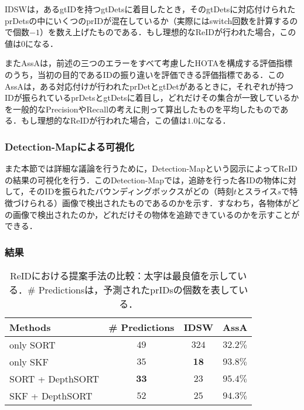     IDSW\cite{luiten2021hota}は，あるgtIDを持つgtDetsに着目したとき，そのgtDetsに対応付けられたprDetsの中にいくつのprIDが混在しているか（実際にはswitch回数を計算するので個数$-1$）を数え上げたものである．もし理想的なReIDが行われた場合，この値は$0$になる．

    またAssA\cite{luiten2021hota}は，前述の三つのエラーをすべて考慮したHOTAを構成する評価指標のうち，当初の目的であるIDの振り違いを評価できる評価指標である．このAssAは，ある対応付けが行われたprDetとgtDetがあるときに，それぞれが持つIDが振られているprDetsとgtDetsに着目し，どれだけその集合が一致しているかを一般的なPrecisionやRecallの考えに則って算出したものを平均したものである．もし理想的なReIDが行われた場合，この値は$1.0$になる．

    \subsubsection{Detection-Mapによる可視化}

    また本節では詳細な議論を行うために，Detection-Mapという図示によってReIDの結果の可視化を行う．このDetection-Mapでは，追跡を行った各IDの物体に対して，そのIDを振られたバウンディングボックスがどの（時刻$t$とスライス$s$で特徴づけられる）画像で検出されたものであるのかを示す．すなわち，各物体がどの画像で検出されたのか，どれだけその物体を追跡できているのかを示すことができる．
    
    \subsubsection{結果}

    \begin{table}[t]
        \centering
        \caption[ReIDにおける提案手法の比較]{ReIDにおける提案手法の比較：太字は最良値を示している．\# Predictionsは，予測されたprIDsの個数を表している．}
        \label{tab:metrics_reidentification}
        \begin{tabular}{l|ccc}
            Methods & \# Predictions & IDSW & AssA 
            \\\hline \hline
            only SORT & $49$ & $324$ & $32.2\%$
            \\ only SKF & $35$ & $\bm{18}$ & $93.8\%$
            \\ SORT + DepthSORT & $\bm{33}$ & $23$ & $\bm{95.4\%}$
            \\ SKF + DepthSORT & $52$ & $25$ & $94.3\%$
        \end{tabular}
    \end{table}

